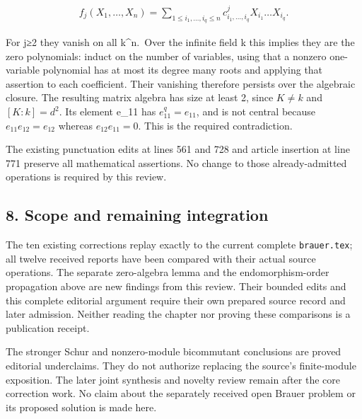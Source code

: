 \documentclass[11pt]{article}
\begin{document}
\[\begin{gathered}
f_{j}(X_{1},\ldots ,X_{n})=\sum _{1\leq i_{1},\ldots ,i_{q}\leq n} c^j_{i_{1},\ldots ,i_{q}} X_{i_{1}}\ldots X_{i_{q}}.
\end{gathered}\]

For j≥2 they vanish on all k\^{}n.~Over the infinite field k this implies they are the zero polynomials: induct on the number of variables, using that a nonzero one-variable polynomial has at most its degree many roots and applying that assertion to each coefficient. Their vanishing therefore persists over the algebraic closure. The resulting matrix algebra has size at least 2, since \(K\ne k\) and \([K:k]=d^{2}\). Its element e\_11 has \(e_{11}^q=e_{11}\), and is not central because \(e_{11} e_{12}=e_{12}\) whereas \(e_{12} e_{11}=0\). This is the required contradiction.

The existing punctuation edits at lines 561 and 728 and article insertion at line 771 preserve all mathematical assertions. No change to those already-admitted operations is required by this review.

\subsection{8. Scope and remaining integration}\label{scope-and-remaining-integration}

The ten existing corrections replay exactly to the current complete \texttt{brauer.tex}; all twelve received reports have been compared with their actual source operations. The separate zero-algebra lemma and the endomorphism-order propagation above are new findings from this review. Their bounded edits and this complete editorial argument require their own prepared source record and later admission. Neither reading the chapter nor proving these comparisons is a publication receipt.

The stronger Schur and nonzero-module bicommutant conclusions are proved editorial underclaims. They do not authorize replacing the source's finite-module exposition. The later joint synthesis and novelty review remain after the core correction work. No claim about the separately received open Brauer problem or its proposed solution is made here.
\end{document}

